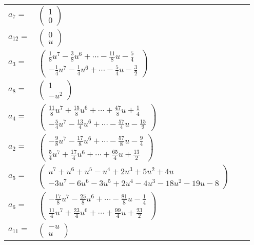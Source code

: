 \documentclass[1p]{elsarticle_modified}
\theoremstyle{definition}
\begin{document}
\begin{tabular}{m{7pt} m{180pt} m{7pt} m{180pt} }
\flushright $a_{7}=$&$\begin{pmatrix}1\\0\end{pmatrix}$ \\
\flushright $a_{12}=$&$\begin{pmatrix}0\\u\end{pmatrix}$ \\
\flushright $a_{3}=$&$\begin{pmatrix}\frac{1}{8} u^7-\frac{3}{8} u^6+\cdots-\frac{11}{8} u-\frac{5}{4}\\-\frac{1}{4} u^7-\frac{1}{4} u^6+\cdots-\frac{5}{4} u-\frac{3}{2}\end{pmatrix}$ \\
\flushright $a_{8}=$&$\begin{pmatrix}1\\- u^2\end{pmatrix}$ \\
\flushright $a_{4}=$&$\begin{pmatrix}\frac{11}{8} u^7+\frac{15}{8} u^6+\cdots+\frac{47}{8} u+\frac{1}{4}\\-\frac{5}{4} u^7-\frac{13}{4} u^6+\cdots-\frac{57}{4} u-\frac{15}{2}\end{pmatrix}$ \\
\flushright $a_{2}=$&$\begin{pmatrix}-\frac{9}{8} u^7-\frac{17}{8} u^6+\cdots-\frac{57}{8} u-\frac{9}{4}\\\frac{5}{4} u^7+\frac{17}{4} u^6+\cdots+\frac{65}{4} u+\frac{13}{2}\end{pmatrix}$ \\
\flushright $a_{5}=$&$\begin{pmatrix}u^7+u^6+u^5- u^4+2 u^3+5 u^2+4 u\\-3 u^7-6 u^6-3 u^5+2 u^4-4 u^3-18 u^2-19 u-8\end{pmatrix}$ \\
\flushright $a_{6}=$&$\begin{pmatrix}-\frac{17}{8} u^7-\frac{25}{8} u^6+\cdots-\frac{81}{8} u-\frac{1}{4}\\\frac{11}{4} u^7+\frac{23}{4} u^6+\cdots+\frac{99}{4} u+\frac{23}{2}\end{pmatrix}$ \\
\flushright $a_{11}=$&$\begin{pmatrix}- u\\u\end{pmatrix}$ \\

\end{tabular}
\end{document}
